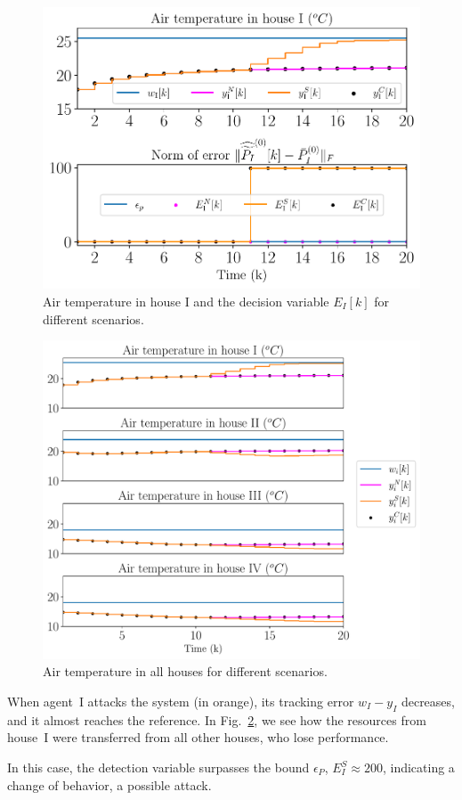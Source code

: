 \documentclass[../main.tex]{subfiles}
\begin{document}
\begin{figure}[h]
  \centering
 \includegraphics[width=.7\textwidth,trim=0 .3cm 0 .2cm,clip]{../img/resilient_ineq/__ErrorWX_command_normErrH.pdf}
  \caption{Air temperature in house I and the decision variable $E_{I}[k]$ for different scenarios.}\label{fig:response3Scenarios}
\end{figure}
\begin{figure}[h]
  \centering
 \includegraphics[width=.7\textwidth,trim=0 .3cm 0 .2cm,clip]{../img/resilient_ineq/ErrorWX_command_normErrH_all_houses.pdf}
  \caption{Air temperature in all houses for different scenarios.}\label{fig:response3Scenarios_all_houses}
\end{figure}

When agent~I attacks the system (in orange), its tracking error
${w_{I}-y_{I}}$ decreases, and it almost reaches the reference.
In Fig.~\ref{fig:response3Scenarios_all_houses}, we see how the resources from house~I were transferred from all other houses, who lose performance.

In this case, the detection variable surpasses the bound $\epsilon_{P}$,
${E_{I}^{S}\approx200}$, indicating a change of behavior, a possible attack.
\end{document}
